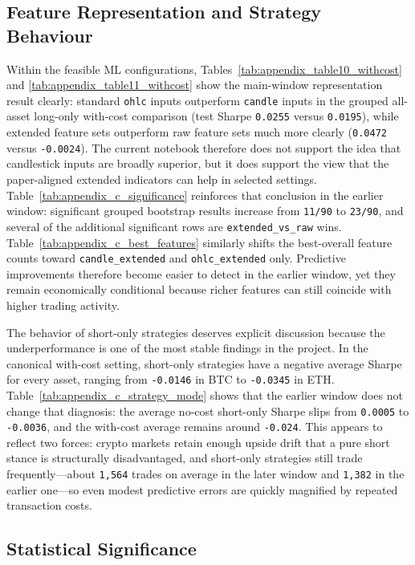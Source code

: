 \documentclass[12pt]{article}
\begin{document}
\subsection{Feature Representation and Strategy Behaviour}

Within the feasible ML configurations, Tables~\ref{tab:appendix_table10_withcost} and \ref{tab:appendix_table11_withcost} show the main-window representation result clearly: standard \texttt{ohlc} inputs outperform \texttt{candle} inputs in the grouped all-asset long-only with-cost comparison (test Sharpe \texttt{0.0255} versus \texttt{0.0195}), while extended feature sets outperform raw feature sets much more clearly (\texttt{0.0472} versus \texttt{-0.0024}). The current notebook therefore does not support the idea that candlestick inputs are broadly superior, but it does support the view that the paper-aligned extended indicators can help in selected settings. Table~\ref{tab:appendix_c_significance} reinforces that conclusion in the earlier window: significant grouped bootstrap results increase from \texttt{11/90} to \texttt{23/90}, and several of the additional significant rows are \texttt{extended\_vs\_raw} wins. Table~\ref{tab:appendix_c_best_features} similarly shifts the best-overall feature counts toward \texttt{candle\_extended} and \texttt{ohlc\_extended} only. Predictive improvements therefore become easier to detect in the earlier window, yet they remain economically conditional because richer features can still coincide with higher trading activity.

The behavior of short-only strategies deserves explicit discussion because the underperformance is one of the most stable findings in the project. In the canonical with-cost setting, short-only strategies have a negative average Sharpe for every asset, ranging from \texttt{-0.0146} in BTC to \texttt{-0.0345} in ETH. Table~\ref{tab:appendix_c_strategy_mode} shows that the earlier window does not change that diagnosis: the average no-cost short-only Sharpe slips from \texttt{0.0005} to \texttt{-0.0036}, and the with-cost average remains around \texttt{-0.024}. This appears to reflect two forces: crypto markets retain enough upside drift that a pure short stance is structurally disadvantaged, and short-only strategies still trade frequently---about \texttt{1,564} trades on average in the later window and \texttt{1,382} in the earlier one---so even modest predictive errors are quickly magnified by repeated transaction costs.

\subsection{Statistical Significance}
\end{document}
